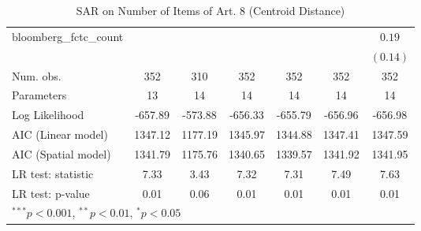 \begin{table}[!h]
\begin{center}
\begin{tabular}{l c c c c c c }
bloomberg\_fctc\_count  &              &              &              &              &              & $0.19$       \\
                        &              &              &              &              &              & $(0.14)$     \\
\midrule
Num. obs.               & 352          & 310          & 352          & 352          & 352          & 352          \\
Parameters              & 13           & 14           & 14           & 14           & 14           & 14           \\
Log Likelihood          & -657.89      & -573.88      & -656.33      & -655.79      & -656.96      & -656.98      \\
AIC (Linear model)      & 1347.12      & 1177.19      & 1345.97      & 1344.88      & 1347.41      & 1347.59      \\
AIC (Spatial model)     & 1341.79      & 1175.76      & 1340.65      & 1339.57      & 1341.92      & 1341.95      \\
LR test: statistic      & 7.33         & 3.43         & 7.32         & 7.31         & 7.49         & 7.63         \\
LR test: p-value        & 0.01         & 0.06         & 0.01         & 0.01         & 0.01         & 0.01         \\
\bottomrule
\multicolumn{7}{l}{\scriptsize{$^{***}p<0.001$, $^{**}p<0.01$, $^*p<0.05$}}
\end{tabular}
\caption{SAR on Number of Items of Art. 8 (Centroid Distance)}
\label{table:coefficients}
\end{center}
\end{table}
